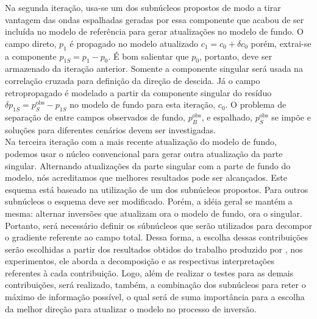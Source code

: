 
Na segunda itera\c c\~ao, usa-se um dos subn\'ucleos propostos de modo a tirar vantagem das ondas espalhadas geradas por essa componente que acabou de ser inclu\'ida no modelo de refer\^encia para gerar atualiza\c c\~oes no modelo de fundo. O campo direto, $p_1$ \'e propagado no modelo atualizado $c_1 = c_0 + \delta c_0$ por\'em, extrai-se a componente $p_{1S} = p_1 - p_0$. \'E bom salientar que $p_0$, portanto, deve ser armazenado da itera\c c\~ao anterior. Somente a componente singular ser\'a usada na correla\c c\~ao cruzada para defini\c c\~ao da dire\c c\~ao de descida. J\'a o campo retropropagado \'e modelado a partir da componente singular do res\'iduo $\delta p_{1S}=p_S^{\text{obs}}-p_{1S}$ no modelo de fundo para esta itera\c c\~ao, $c_0$. O problema de separa\c c\~ao de entre campos observados de fundo, $p_B^{\text{obs}}$, e espalhado, $p_S^{\text{obs}}$ se imp\~oe e solu\c c\~oes para diferentes cen\'arios devem ser investigadas. \\ 


Na terceira itera\c c\~ao com a mais recente atualiza\c c\~ao do modelo de fundo, podemos usar o n\'ucleo convencional para 
gerar outra atualiza\c c\~ao da parte singular. Alternando atualiza\c c\~oes  da parte singular com a parte de fundo do modelo, n\'os acreditamos que melhores resultados pode ser alcan\c cados. Este esquema est\'a baseado na utiliza\c c\~ao de um dos subn\'ucleos propostos. Para outros subn\'ucleos o esquema deve ser modificado. Porém, a id\'eia geral se mant\'em a mesma: alternar invers\~oes que atualizam ora o modelo de fundo, ora o singular.\\

Portanto, será necessário definir os súbnúcleos que serão utilizados para decompor o gradiente referente ao campo total. Dessa forma, a escolha dessas contribuições serão escolhidas a partir dos resultados obtidos do trabalho produzido por \citet{macedo_2014}, nos experimentos, ele aborda a decomposição e as respectivas interpretações referentes à cada contribuição. Logo, além de realizar o testes para as demais contribuições, será realizado, também, a combinação dos subnúcleos para reter o máximo de informação possível, o qual será de suma importância para a escolha da melhor direção para atualizar o modelo no processo de inversão.

